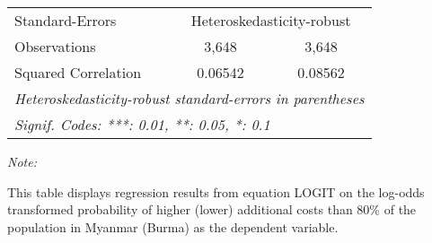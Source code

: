 \begin{table}[htbp!]
\begin{adjustbox}{width = 1\textwidth, max height = 0.95\textheight, center}
\begin{threeparttable}[b]
\begin{tabular}{lcc}
            Standard-Errors & \multicolumn{2}{c}{Heteroskedasticity-robust} \\ 
            Observations         & 3,648         & 3,648\\  
            Squared Correlation  & 0.06542       & 0.08562\\  
            \midrule \midrule
            \multicolumn{3}{l}{\emph{Heteroskedasticity-robust standard-errors in parentheses}}\\
            \multicolumn{3}{l}{\emph{Signif. Codes: ***: 0.01, **: 0.05, *: 0.1}}\\
         \end{tabular}
         
         \begin{tablenotes}\item \medskip \textit{Note:}
            \item This table displays regression results from equation LOGIT on the log-odds transformed probability of higher (lower) additional costs than 80\% of the population in Myanmar (Burma) as the dependent variable. 
         \end{tablenotes}
      \end{threeparttable}
   \end{adjustbox}
\end{table}


